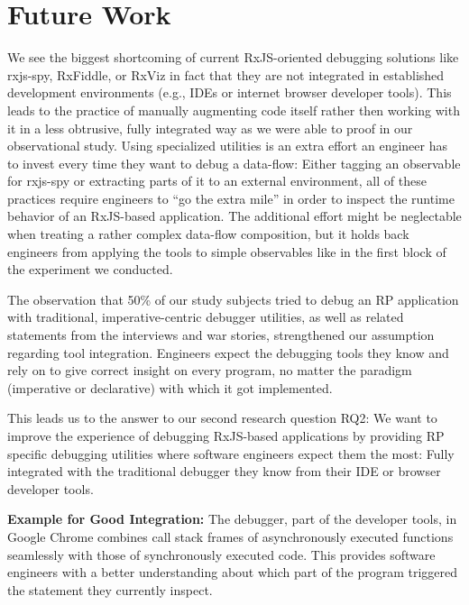\documentclass[sigplan,screen,review]{acmart}
\begin{document}
\section{Future Work}
\label{sec:future}

We see the biggest shortcoming of current RxJS-oriented debugging solutions like rxjs-spy, RxFiddle, or RxViz in fact that they are not integrated in established development environments (e.g., IDEs or internet browser developer tools). This leads to the practice of manually augmenting code itself rather then working with it in a less obtrusive, fully integrated way as we were able to proof in our observational study. Using specialized utilities is an extra effort an engineer has to invest every time they want to debug a data-flow: Either tagging an observable for rxjs-spy or extracting parts of it to an external environment, all of these practices require engineers to ``go the extra mile'' in order to inspect the runtime behavior of an RxJS-based application. The additional effort might be neglectable when treating a rather complex data-flow composition, but it holds back engineers from applying the tools to simple observables like in the first block of the experiment we conducted.

The observation that 50\% of our study subjects tried to debug an RP application with traditional, imperative-centric debugger utilities, as well as related statements from the interviews and war stories, strengthened our assumption regarding tool integration. Engineers expect the debugging tools they know and rely on to give correct insight on every program, no matter the paradigm (imperative or declarative) with which it got implemented.

This leads us to the answer to our second research question RQ2: We want to improve the experience of debugging RxJS-based applications by providing RP specific debugging utilities where software engineers expect them the most: Fully integrated with the traditional debugger they know from their IDE or browser developer tools.

\begin{tcolorbox}[colback=white,boxrule=1pt,sharp corners=all,left=1.8mm,boxsep=1mm]
	\textbf{Example for Good Integration:} The debugger, part of the developer tools, in Google Chrome combines call stack frames of asynchronously executed functions\cite{chromeasync} seamlessly with those of synchronously executed code. This provides software engineers with a better understanding about which part of the program triggered the statement they currently inspect.
\end{tcolorbox}
\end{document}
